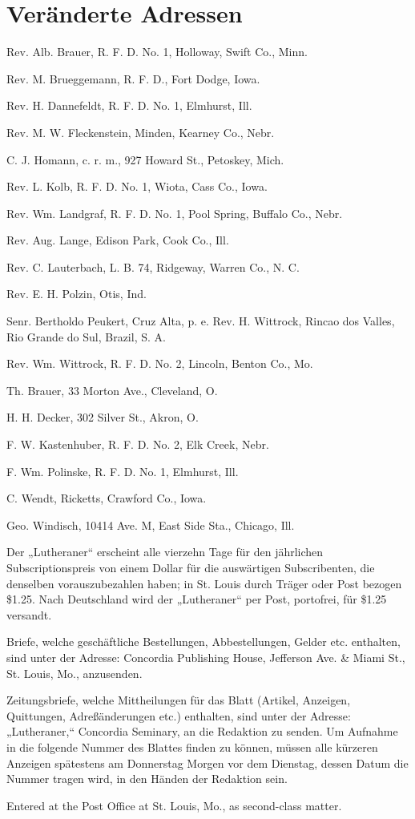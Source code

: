 \chapter[Veränderte Adressen]{Veränderte Adressen}

Rev. Alb. Brauer, R. F. D. No. 1, Holloway, Swift Co., Minn.

Rev. M. Brueggemann, R. F. D., Fort Dodge, Iowa.

Rev. H. Dannefeldt, R. F. D. No. 1, Elmhurst, Ill.

Rev. M. W. Fleckenstein, Minden, Kearney Co., Nebr.

C. J. Homann, c. r. m., 927 Howard St., Petoskey, Mich.

Rev. L. Kolb, R. F. D. No. 1, Wiota, Cass Co., Iowa.

Rev. Wm. Landgraf, R. F. D. No. 1, Pool Spring, Buffalo Co., Nebr.

Rev. Aug. Lange, Edison Park, Cook Co., Ill.

Rev. C. Lauterbach, L. B. 74, Ridgeway, Warren Co., N. C.

Rev. E. H. Polzin, Otis, Ind.

Senr. Bertholdo Peukert, Cruz Alta, p. e. Rev. H. Wittrock, Rincao dos Valles, Rio Grande do Sul, Brazil, S. A.

Rev. Wm. Wittrock, R. F. D. No. 2, Lincoln, Benton Co., Mo.

Th. Brauer, 33 Morton Ave., Cleveland, O.

H. H. Decker, 302 Silver St., Akron, O.

F. W. Kastenhuber, R. F. D. No. 2, Elk Creek, Nebr.

F. Wm. Polinske, R. F. D. No. 1, Elmhurst, Ill.

C. Wendt, Ricketts, Crawford Co., Iowa.

Geo. Windisch, 10414 Ave. M, East Side Sta., Chicago, Ill.

Der „Lutheraner“ erscheint alle vierzehn Tage für den jährlichen Subscriptionspreis von einem Dollar für die auswärtigen Subscribenten, die denselben vorauszubezahlen haben; in St. Louis durch Träger oder Post bezogen \$1.25. Nach Deutschland wird der „Lutheraner“ per Post, portofrei, für \$1.25 versandt.

Briefe, welche geschäftliche Bestellungen, Abbestellungen, Gelder etc. enthalten, sind unter der Adresse: Concordia Publishing House, Jefferson Ave. \& Miami St., St. Louis, Mo., anzusenden.

Zeitungsbriefe, welche Mittheilungen für das Blatt (Artikel, Anzeigen, Quittungen, Adreßänderungen etc.) enthalten, sind unter der Adresse: „Lutheraner,“ Concordia Seminary, an die Redaktion zu senden. Um Aufnahme in die folgende Nummer des Blattes finden zu können, müssen alle kürzeren Anzeigen spätestens am Donnerstag Morgen vor dem Dienstag, dessen Datum die Nummer tragen wird, in den Händen der Redaktion sein.

Entered at the Post Office at St. Louis, Mo., as second-class matter.
